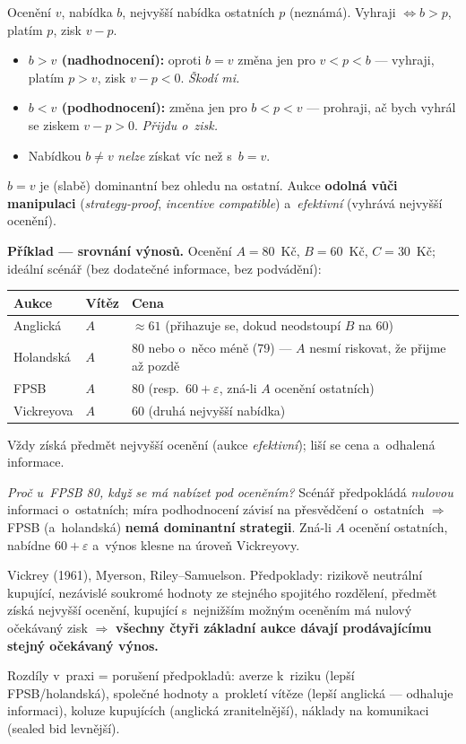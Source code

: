 \documentclass[11pt,a4paper]{article}
\theoremstyle{definition}
\begin{document}
\begin{defbox}
Ocenění $v$, nabídka $b$, nejvyšší nabídka ostatních $p$ (neznámá). Vyhraji $\iff b > p$, platím
$p$, zisk $v - p$.
\begin{itemize}
\item \textbf{$b > v$ (nadhodnocení):} oproti $b=v$ změna jen pro $v < p < b$ --- vyhraji,
  platím $p > v$, zisk $v - p < 0$. \emph{Škodí mi.}
\item \textbf{$b < v$ (podhodnocení):} změna jen pro $b < p < v$ --- prohraji, ač bych vyhrál
  se ziskem $v - p > 0$. \emph{Přijdu o~zisk.}
\item Nabídkou $b \ne v$ \emph{nelze} získat víc než s~$b = v$.
\end{itemize}
$b = v$ je (slabě) dominantní bez ohledu na ostatní. Aukce \textbf{odolná vůči manipulaci}
(\emph{strategy-proof}, \emph{incentive compatible}) a~\emph{efektivní} (vyhrává nejvyšší
ocenění).
\end{defbox}

\medskip
\noindent\textbf{Příklad --- srovnání výnosů.} Ocenění $A = 80$~Kč, $B = 60$~Kč, $C = 30$~Kč;
ideální scénář (bez dodatečné informace, bez podvádění):
\begin{center}\small
\begin{tabular}{lll}
\toprule
\textbf{Aukce} & \textbf{Vítěz} & \textbf{Cena} \\
\midrule
Anglická & $A$ & $\approx 61$ (přihazuje se, dokud neodstoupí $B$ na 60) \\
Holandská & $A$ & $80$ nebo o~něco méně (79) --- $A$ nesmí riskovat, že přijme až pozdě \\
FPSB & $A$ & $80$ (resp.\ $60+\varepsilon$, zná-li $A$ ocenění ostatních) \\
Vickreyova & $A$ & $60$ (druhá nejvyšší nabídka) \\
\bottomrule
\end{tabular}
\end{center}
Vždy získá předmět nejvyšší ocenění (aukce \emph{efektivní}); liší se cena a~odhalená informace.

\emph{Proč u~FPSB 80, když se má nabízet pod oceněním?} Scénář předpokládá \emph{nulovou}
informaci o~ostatních; míra podhodnocení závisí na přesvědčení o~ostatních $\Rightarrow$ FPSB
(a~holandská) \textbf{nemá dominantní strategii}. Zná-li $A$ ocenění ostatních, nabídne
$60+\varepsilon$ a~výnos klesne na úroveň Vickreyovy.

\begin{defbox}
Vickrey (1961), Myerson, Riley--Samuelson. Předpoklady: rizikově neutrální kupující, nezávislé
soukromé hodnoty ze stejného spojitého rozdělení, předmět získá nejvyšší ocenění, kupující
s~nejnižším možným oceněním má nulový očekávaný zisk $\Rightarrow$ \textbf{všechny čtyři
základní aukce dávají prodávajícímu stejný očekávaný výnos.}

Rozdíly v~praxi = porušení předpokladů: averze k~riziku (lepší FPSB/holandská), společné hodnoty
a~prokletí vítěze (lepší anglická --- odhaluje informaci), koluze kupujících (anglická
zranitelnější), náklady na komunikaci (sealed bid levnější).
\end{defbox}
\end{document}
